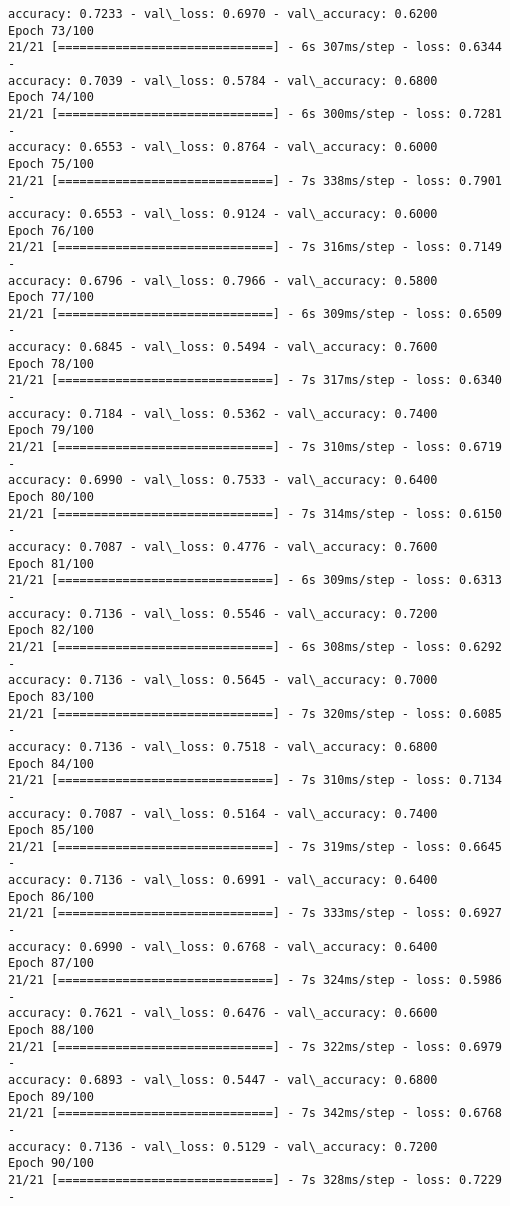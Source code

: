 \documentclass[11pt]{article}
\begin{document}
\begin{Verbatim}[commandchars=\\\{\}]
accuracy: 0.7233 - val\_loss: 0.6970 - val\_accuracy: 0.6200
Epoch 73/100
21/21 [==============================] - 6s 307ms/step - loss: 0.6344 -
accuracy: 0.7039 - val\_loss: 0.5784 - val\_accuracy: 0.6800
Epoch 74/100
21/21 [==============================] - 6s 300ms/step - loss: 0.7281 -
accuracy: 0.6553 - val\_loss: 0.8764 - val\_accuracy: 0.6000
Epoch 75/100
21/21 [==============================] - 7s 338ms/step - loss: 0.7901 -
accuracy: 0.6553 - val\_loss: 0.9124 - val\_accuracy: 0.6000
Epoch 76/100
21/21 [==============================] - 7s 316ms/step - loss: 0.7149 -
accuracy: 0.6796 - val\_loss: 0.7966 - val\_accuracy: 0.5800
Epoch 77/100
21/21 [==============================] - 6s 309ms/step - loss: 0.6509 -
accuracy: 0.6845 - val\_loss: 0.5494 - val\_accuracy: 0.7600
Epoch 78/100
21/21 [==============================] - 7s 317ms/step - loss: 0.6340 -
accuracy: 0.7184 - val\_loss: 0.5362 - val\_accuracy: 0.7400
Epoch 79/100
21/21 [==============================] - 7s 310ms/step - loss: 0.6719 -
accuracy: 0.6990 - val\_loss: 0.7533 - val\_accuracy: 0.6400
Epoch 80/100
21/21 [==============================] - 7s 314ms/step - loss: 0.6150 -
accuracy: 0.7087 - val\_loss: 0.4776 - val\_accuracy: 0.7600
Epoch 81/100
21/21 [==============================] - 6s 309ms/step - loss: 0.6313 -
accuracy: 0.7136 - val\_loss: 0.5546 - val\_accuracy: 0.7200
Epoch 82/100
21/21 [==============================] - 6s 308ms/step - loss: 0.6292 -
accuracy: 0.7136 - val\_loss: 0.5645 - val\_accuracy: 0.7000
Epoch 83/100
21/21 [==============================] - 7s 320ms/step - loss: 0.6085 -
accuracy: 0.7136 - val\_loss: 0.7518 - val\_accuracy: 0.6800
Epoch 84/100
21/21 [==============================] - 7s 310ms/step - loss: 0.7134 -
accuracy: 0.7087 - val\_loss: 0.5164 - val\_accuracy: 0.7400
Epoch 85/100
21/21 [==============================] - 7s 319ms/step - loss: 0.6645 -
accuracy: 0.7136 - val\_loss: 0.6991 - val\_accuracy: 0.6400
Epoch 86/100
21/21 [==============================] - 7s 333ms/step - loss: 0.6927 -
accuracy: 0.6990 - val\_loss: 0.6768 - val\_accuracy: 0.6400
Epoch 87/100
21/21 [==============================] - 7s 324ms/step - loss: 0.5986 -
accuracy: 0.7621 - val\_loss: 0.6476 - val\_accuracy: 0.6600
Epoch 88/100
21/21 [==============================] - 7s 322ms/step - loss: 0.6979 -
accuracy: 0.6893 - val\_loss: 0.5447 - val\_accuracy: 0.6800
Epoch 89/100
21/21 [==============================] - 7s 342ms/step - loss: 0.6768 -
accuracy: 0.7136 - val\_loss: 0.5129 - val\_accuracy: 0.7200
Epoch 90/100
21/21 [==============================] - 7s 328ms/step - loss: 0.7229 -

\end{Verbatim}
\end{document}
